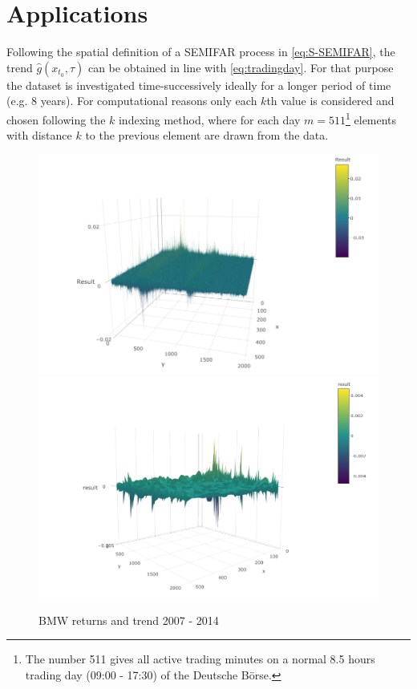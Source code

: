 \documentclass[12pt]{article}
\begin{document}

\section{Applications }
Following the spatial definition of a SEMIFAR process in \eqref{eq:S-SEMIFAR}, the trend \( \hat{g}(x_{t_{0}},\tau) \) can be obtained in line with \eqref{eq:tradingday}.
For that purpose the dataset is investigated time-successively ideally for a longer period of time (e.g. 8 years). For computational reasons only each \(k\)th value is considered and chosen following the \(k\) indexing method, where for each day \(m = 511\)\footnote{The number 511 gives all active trading minutes on a normal 8.5 hours trading day (09:00 - 17:30) of the Deutsche Börse. } elements with distance \(k\) to the previous element are drawn from the data. 
\begin{figure}[ht] 
	\centering
	\includegraphics[width=1\textwidth]{BMW_Returns_lattice4.png}
	\includegraphics[width=1\textwidth]{BMW_07_14_Ret_trend.png}
	\caption{BMW returns and trend 2007 - 2014}
	\label{figure:5.1a}
\end{figure}
\end{document}
